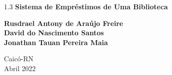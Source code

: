 \begin{titlepage}
\begin{center}
		{\setlength{\baselineskip}%
		{1.3\baselineskip}
		{\LARGE \textbf{Sistema de Empréstimos de Uma Biblioteca}}\par}
			
		\vspace{3cm}
			
		{\large \textbf{Rusdrael Antony de Araújo Freire\\ David do Nascimento Santos\\ Jonathan Tauan Pereira Maia}}
						
		\vspace{6cm}
		
		Caicó-RN\\Abril 2022
	\end{center}
\end{titlepage}